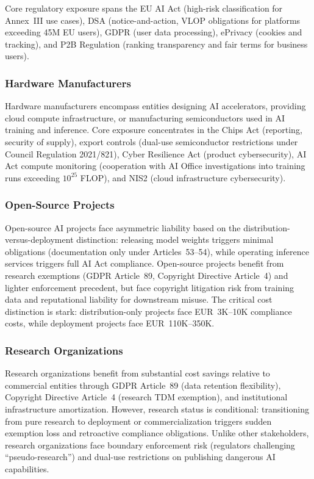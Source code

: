 \documentclass[11pt,a4paper]{article}
\begin{document}
Core regulatory exposure spans the EU AI Act (high-risk classification for Annex~III use cases), DSA (notice-and-action, VLOP obligations for platforms exceeding 45M EU users), GDPR (user data processing), ePrivacy (cookies and tracking), and P2B Regulation (ranking transparency and fair terms for business users).

\subsubsection{Hardware Manufacturers}

Hardware manufacturers encompass entities designing AI accelerators, providing cloud compute infrastructure, or manufacturing semiconductors used in AI training and inference. Core exposure concentrates in the Chips Act (reporting, security of supply), export controls (dual-use semiconductor restrictions under Council Regulation 2021/821), Cyber Resilience Act (product cybersecurity), AI Act compute monitoring (cooperation with AI Office investigations into training runs exceeding $10^{25}$ FLOP), and NIS2 (cloud infrastructure cybersecurity).

\subsubsection{Open-Source Projects}

Open-source AI projects face asymmetric liability based on the distribution-versus-deployment distinction: releasing model weights triggers minimal obligations (documentation only under Articles~53--54), while operating inference services triggers full AI Act compliance. Open-source projects benefit from research exemptions (GDPR Article~89, Copyright Directive Article~4) and lighter enforcement precedent, but face copyright litigation risk from training data and reputational liability for downstream misuse. The critical cost distinction is stark: distribution-only projects face EUR~3K--10K compliance costs, while deployment projects face EUR~110K--350K.

\subsubsection{Research Organizations}

Research organizations benefit from substantial cost savings relative to commercial entities through GDPR Article~89 (data retention flexibility), Copyright Directive Article~4 (research TDM exemption), and institutional infrastructure amortization. However, research status is conditional: transitioning from pure research to deployment or commercialization triggers sudden exemption loss and retroactive compliance obligations. Unlike other stakeholders, research organizations face boundary enforcement risk (regulators challenging ``pseudo-research'') and dual-use restrictions on publishing dangerous AI capabilities.
\end{document}
